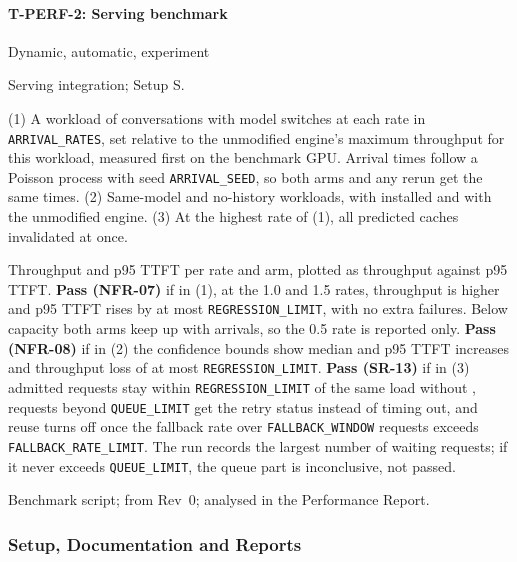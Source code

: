 \documentclass[12pt, titlepage]{article}
\newenvironment{testcase}[2]
  {\Needspace{8\baselineskip}\paragraph{#1: #2}\phantomsection\label{test:#1}\sloppy
   \begin{description}[style=sameline, leftmargin=3.6cm, labelwidth=3.4cm,
     font=\normalfont\bfseries, itemsep=2pt, topsep=2pt]}
  {\end{description}}
\newcommand{\cst}[1]{\texttt{#1}}
\begin{document}
\begin{testcase}{T-PERF-2}{Serving benchmark}
\item[Type] Dynamic, automatic, experiment
\item[Initial state] Serving integration; Setup S.
\item[Input/Condition] (1) A workload of conversations with model switches
at each rate in \cst{ARRIVAL\_RATES}, set relative to the unmodified
engine's maximum throughput for this workload, measured first on the
benchmark GPU. Arrival times follow a Poisson process with seed
\cst{ARRIVAL\_SEED}, so both arms and any rerun get the same times.
(2) Same-model and no-history workloads, with \progname{} installed and with
the unmodified engine. (3) At the highest rate of (1), all predicted caches
invalidated at once.
\item[Output/Result] Throughput and p95 TTFT per rate and arm, plotted as
throughput against p95 TTFT. \textbf{Pass (NFR-07)} if in (1), at the 1.0 and 1.5 rates,
throughput is higher and p95 TTFT rises by at most \cst{REGRESSION\_LIMIT}, with no
extra failures. Below capacity both arms keep up with arrivals, so the 0.5
rate is reported only. \textbf{Pass (NFR-08)} if in (2) the confidence bounds show
median and p95 TTFT increases and throughput loss of at most
\cst{REGRESSION\_LIMIT}. \textbf{Pass (SR-13)} if in (3) admitted requests
stay within \cst{REGRESSION\_LIMIT} of the same load without \progname{},
requests beyond \cst{QUEUE\_LIMIT} get the retry status instead of timing
out, and reuse turns off once the fallback rate over
\cst{FALLBACK\_WINDOW} requests exceeds \cst{FALLBACK\_RATE\_LIMIT}.
The run records the largest number of waiting requests; if it never
exceeds \cst{QUEUE\_LIMIT}, the queue part is inconclusive, not passed.
\item[How performed] Benchmark script; from Rev~0; analysed in the
Performance Report.
\end{testcase}

\subsubsection{Setup, Documentation and Reports}
\end{document}
